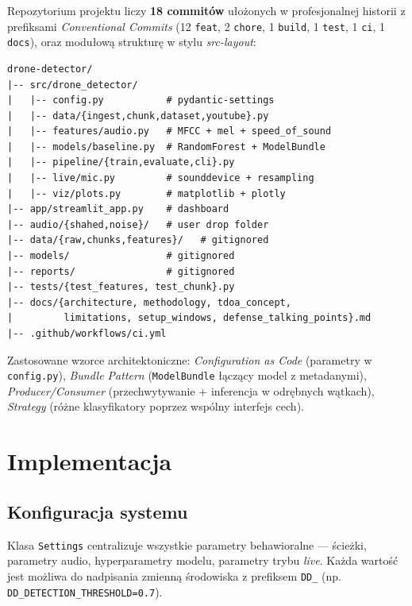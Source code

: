 \documentclass[11pt,a4paper]{article}
\begin{document}
Repozytorium projektu \cite{repo} liczy \textbf{18 commitów} ułożonych w
profesjonalnej historii z prefiksami \emph{Conventional Commits} (12 \texttt{feat},
2 \texttt{chore}, 1 \texttt{build}, 1 \texttt{test}, 1 \texttt{ci}, 1
\texttt{docs}), oraz modułową strukturę w stylu \emph{src-layout}:

\begin{verbatim}
drone-detector/
|-- src/drone_detector/
|   |-- config.py           # pydantic-settings
|   |-- data/{ingest,chunk,dataset,youtube}.py
|   |-- features/audio.py   # MFCC + mel + speed_of_sound
|   |-- models/baseline.py  # RandomForest + ModelBundle
|   |-- pipeline/{train,evaluate,cli}.py
|   |-- live/mic.py         # sounddevice + resampling
|   |-- viz/plots.py        # matplotlib + plotly
|-- app/streamlit_app.py    # dashboard
|-- audio/{shahed,noise}/   # user drop folder
|-- data/{raw,chunks,features}/   # gitignored
|-- models/                 # gitignored
|-- reports/                # gitignored
|-- tests/{test_features, test_chunk}.py
|-- docs/{architecture, methodology, tdoa_concept,
|         limitations, setup_windows, defense_talking_points}.md
|-- .github/workflows/ci.yml
\end{verbatim}

Zastosowane wzorce architektoniczne: \emph{Configuration as Code} (parametry
w \texttt{config.py}), \emph{Bundle Pattern} (\texttt{ModelBundle} łączący model
z metadanymi), \emph{Producer/Consumer} (przechwytywanie + inferencja w odrębnych
wątkach), \emph{Strategy} (różne klasyfikatory poprzez wspólny interfejs cech).

\section{Implementacja}

\subsection{Konfiguracja systemu}

Klasa \texttt{Settings} centralizuje wszystkie parametry behawioralne ---
ścieżki, parametry audio, hyperparametry modelu, parametry trybu \emph{live}.
Każda wartość jest możliwa do nadpisania zmienną środowiska z prefiksem
\texttt{DD\_} (np. \texttt{DD\_DETECTION\_THRESHOLD=0.7}).
\end{document}
